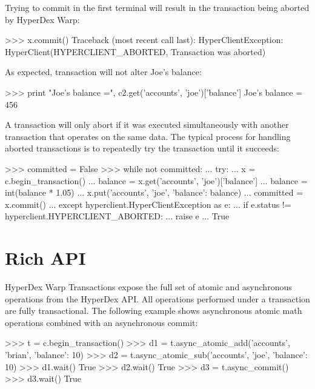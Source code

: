 Trying to commit  in the first terminal will result in the transaction
being aborted by HyperDex Warp:

\begin{pyconcode}
>>> x.commit()
Traceback (most recent call last):
HyperClientException: HyperClient(HYPERCLIENT_ABORTED, Transaction was aborted)
\end{pyconcode}

As expected, transaction  will not alter Joe's balance:

\begin{pyconcode}
>>> print "Joe's balance =", c2.get('accounts', 'joe')['balance']
Joe's balance = 456
\end{pyconcode}

A transaction will only abort if it was executed simultaneously with another
transaction that operates on the same data.  The typical process for handling
aborted transactions is to repeatedly try the transaction until it succeeds:

\begin{pyconcode}
>>> committed = False
>>> while not committed:
...     try:
...         x = c.begin_transaction()
...         balance = x.get('accounts', 'joe')['balance']
...         balance = int(balance * 1.05)
...         x.put('accounts', 'joe', {'balance': balance})
...         committed = x.commit()
...     except hyperclient.HyperClientException as e:
...         if e.status != hyperclient.HYPERCLIENT_ABORTED:
...             raise e
...
True
\end{pyconcode}

\section{Rich API}
\label{sec:transactions:API}

HyperDex Warp Transactions expose the full set of atomic and asynchronous
operations from the HyperDex API.  All operations performed under a transaction
are fully transactional.  The following example shows asynchronous atomic math
operations combined with an asynchronous commit:

\begin{pyconcode}
>>> t = c.begin_transaction()
>>> d1 = t.async_atomic_add('accounts', 'brian', {'balance': 10})
>>> d2 = t.async_atomic_sub('accounts', 'joe', {'balance': 10})
>>> d1.wait()
True
>>> d2.wait()
True
>>> d3 = t.async_commit()
>>> d3.wait()
True
\end{pyconcode}

